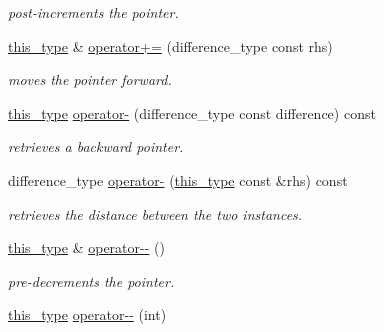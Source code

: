 \begin{DoxyCompactItemize}
\begin{DoxyCompactList}\small\item\em post-\/increments the pointer. \end{DoxyCompactList}\item 
\hyperlink{classhryky_1_1_offset_ptr_a73a85221d5352162be046159f4aea008}{this\-\_\-type} \& \hyperlink{classhryky_1_1_offset_ptr_a1f855447fc5886b2518be1f89d9f686b}{operator+=} (difference\-\_\-type const rhs)
\begin{DoxyCompactList}\small\item\em moves the pointer forward. \end{DoxyCompactList}\item 
\hypertarget{classhryky_1_1_offset_ptr_a6c158180159c88dac9495ff9ebfca368}{\hyperlink{classhryky_1_1_offset_ptr_a73a85221d5352162be046159f4aea008}{this\-\_\-type} \hyperlink{classhryky_1_1_offset_ptr_a6c158180159c88dac9495ff9ebfca368}{operator-\/} (difference\-\_\-type const difference) const }\label{classhryky_1_1_offset_ptr_a6c158180159c88dac9495ff9ebfca368}

\begin{DoxyCompactList}\small\item\em retrieves a backward pointer. \end{DoxyCompactList}\item 
\hypertarget{classhryky_1_1_offset_ptr_a61e9d4ecdbb0377dffefb557515f0088}{difference\-\_\-type \hyperlink{classhryky_1_1_offset_ptr_a61e9d4ecdbb0377dffefb557515f0088}{operator-\/} (\hyperlink{classhryky_1_1_offset_ptr_a73a85221d5352162be046159f4aea008}{this\-\_\-type} const \&rhs) const }\label{classhryky_1_1_offset_ptr_a61e9d4ecdbb0377dffefb557515f0088}

\begin{DoxyCompactList}\small\item\em retrieves the distance between the two instances. \end{DoxyCompactList}\item 
\hypertarget{classhryky_1_1_offset_ptr_a2d2563706f0601ae917b637b672f7370}{\hyperlink{classhryky_1_1_offset_ptr_a73a85221d5352162be046159f4aea008}{this\-\_\-type} \& \hyperlink{classhryky_1_1_offset_ptr_a2d2563706f0601ae917b637b672f7370}{operator-\/-\/} ()}\label{classhryky_1_1_offset_ptr_a2d2563706f0601ae917b637b672f7370}

\begin{DoxyCompactList}\small\item\em pre-\/decrements the pointer. \end{DoxyCompactList}\item 
\hypertarget{classhryky_1_1_offset_ptr_ab15b7a0d274fd3a59326f87bcef843fa}{\hyperlink{classhryky_1_1_offset_ptr_a73a85221d5352162be046159f4aea008}{this\-\_\-type} \hyperlink{classhryky_1_1_offset_ptr_ab15b7a0d274fd3a59326f87bcef843fa}{operator-\/-\/} (int)}\label{classhryky_1_1_offset_ptr_ab15b7a0d274fd3a59326f87bcef843fa}


\end{DoxyCompactItemize}
